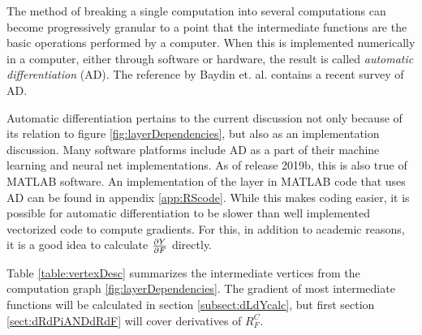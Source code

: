 The method of breaking a single computation into several computations can become progressively granular to a point that the intermediate functions are the basic operations performed by a computer. When this is implemented numerically in a computer, either through software or hardware, the result is called \textit{automatic differentiation} (AD).  The reference by Baydin et. al. \cite{baydin2017automatic} contains a recent survey of AD.  

Automatic differentiation pertains to the current discussion not only because of its relation to figure \ref{fig:layerDependencies}, but also as an implementation discussion. Many software platforms include AD as a part of their machine learning and neural net implementations. As of release 2019b, this is also true of MATLAB software.  An implementation of the \RS layer in MATLAB code  that uses AD can be found in appendix \ref{app:RScode}.  While this makes coding easier, it is possible for automatic differentiation to be slower than well implemented vectorized code to compute gradients.  For this, in addition to academic reasons, it is a good idea to calculate \( \pdv{Y}{F} \) directly.

Table \ref{table:vertexDesc} summarizes the intermediate vertices from the computation graph \ref{fig:layerDependencies}.  The gradient of most intermediate functions will be calculated in section \ref{subsect:dLdYcalc}, but first section \ref{sect:dRdPiANDdRdF} will cover derivatives of \( R_F^C \).

